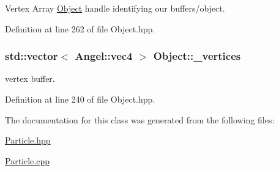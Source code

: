 Vertex Array \hyperlink{class_object}{Object} handle identifying our buffers/object. 



Definition at line 262 of file Object.\-hpp.

\hypertarget{class_object_a4ac354b3ec284f27358b1d4b8d95b9a9}{
\subsubsection[{\-\_\-vertices}]{\setlength{\rightskip}{0pt plus 5cm}std\-::vector$<$ {\bf Angel\-::vec4} $>$ Object\-::\-\_\-vertices\hspace{0.3cm}{\ttfamily [inherited]}}}\label{class_object_a4ac354b3ec284f27358b1d4b8d95b9a9}


vertex buffer. 



Definition at line 240 of file Object.\-hpp.



The documentation for this class was generated from the following files\-:\begin{DoxyCompactItemize}
\item 
\hyperlink{_particle_8hpp}{Particle.\-hpp}\item 
\hyperlink{_particle_8cpp}{Particle.\-cpp}\end{DoxyCompactItemize}
